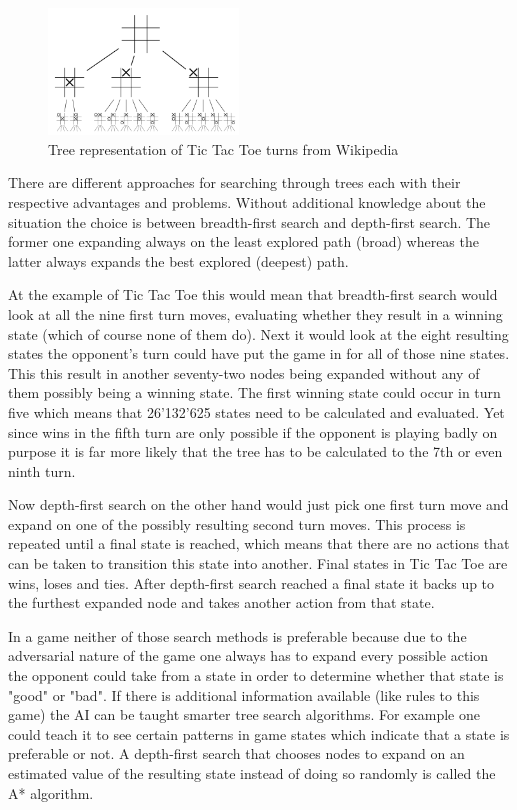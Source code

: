 \begin{figure}[H]
  \includegraphics[width=0.45\textwidth]{images/tree_search_tic_tac_toe.png}
  \caption[\url{http://en.wikipedia.org/wiki/Tic-tac-toe}]{Tree representation of Tic Tac Toe turns from Wikipedia}
\end{figure}

There are different approaches for searching through trees each with their respective advantages and problems. Without additional knowledge about the situation the choice is between breadth-first search and depth-first search. The former one expanding always on the least explored path (broad) whereas the latter always expands the best explored (deepest) path. 

At the example of Tic Tac Toe this would mean that breadth-first search would look at all the nine first turn moves, evaluating whether they result in a winning state (which of course none of them do). Next it would look at the eight resulting states the opponent's turn could have put the game in for all of those nine states. This this result in another seventy-two nodes being expanded without any of them possibly being a winning state. The first winning state could occur in turn five which means that 26'132'625 states need to be calculated and evaluated. Yet since wins in the fifth turn are only possible if the opponent is playing badly on purpose it is far more likely that the tree has to be calculated to the 7th or even ninth turn.

Now depth-first search on the other hand would just pick one first turn move and expand on one of the possibly resulting second turn moves. This process is repeated until a final state is reached, which means that there are no actions that can be taken to transition this state into another. Final states in Tic Tac Toe are wins, loses and ties. After depth-first search reached a final state it backs up to the furthest expanded node and takes another action from that state.

In a game neither of those search methods is preferable because due to the adversarial nature of the game one always has to expand every possible action the opponent could take from a state in order to determine whether that state is "good" or "bad". If there is additional information available (like rules to this game) the AI can be taught smarter tree search algorithms. For example one could teach it to see certain patterns in game states which indicate that a state is preferable or not. A depth-first search that chooses nodes to expand on an estimated value of the resulting state instead of doing so randomly is called the A* algorithm.

